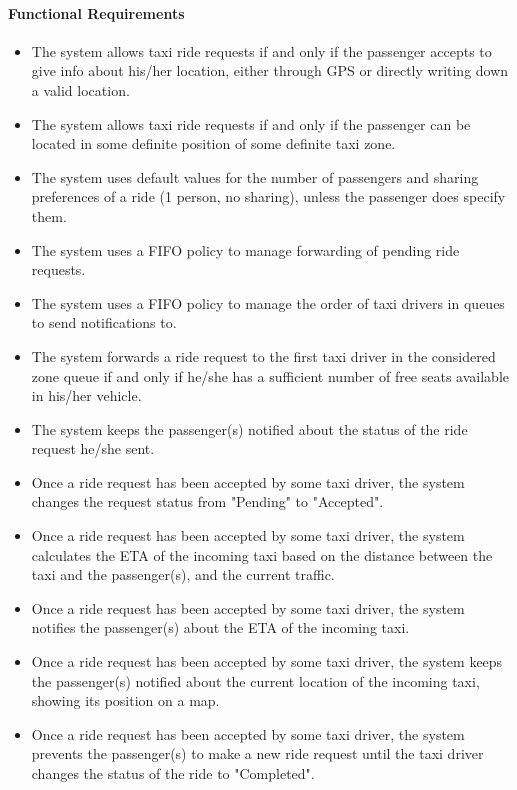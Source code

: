 \paragraph{Functional Requirements}
\begin{itemize}
	
	\item The system allows taxi ride requests if and only if the passenger accepts to give info about his/her location, either through GPS or directly writing down a valid location.
	
	\item The system allows taxi ride requests if and only if the passenger can be located in some definite position of some definite taxi zone.
	
	\item The system uses default values for the number of passengers and sharing preferences of a ride (1 person, no sharing), unless the passenger does specify them.
	
	\item The system uses a FIFO policy to manage forwarding of pending ride requests.
	
	\item The system uses a FIFO policy to manage the order of taxi drivers in queues to send notifications to.
	
	\item The system forwards a ride request to the first taxi driver in the considered zone queue if and only if he/she has a sufficient number of free seats available in his/her vehicle.
	
	\item The system keeps the passenger(s) notified about the status of the ride request he/she sent.
	
	\item Once a ride request has been accepted by some taxi driver, the system changes the request status from "Pending" to "Accepted".
	
	\item Once a ride request has been accepted by some taxi driver, the system calculates the ETA of the incoming taxi based on the distance between the taxi and the passenger(s), and the current traffic.
	
	\item Once a ride request has been accepted by some taxi driver, the system notifies the passenger(s) about the ETA of the incoming taxi.
	
	\item Once a ride request has been accepted by some taxi driver, the system keeps the passenger(s) notified about the current location of the incoming taxi, showing its position on a map.
	
	\item Once a ride request has been accepted by some taxi driver, the system prevents the passenger(s) to make a new ride request until the taxi driver changes the status of the ride to "Completed".
\end{itemize}

